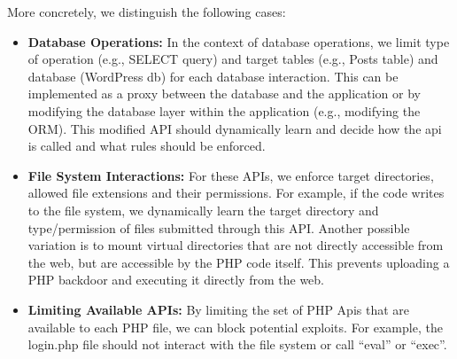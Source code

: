More concretely, we distinguish the following cases:
\begin{itemize}
  \item \textbf{Database Operations:} In the context of database operations, we limit type of operation (e.g., SELECT query) and target tables (e.g., Posts table) and database (WordPress db) for each database interaction. This can be implemented as a proxy between the database and the application or by modifying the database layer within the application (e.g., modifying the ORM). This modified API should dynamically learn and decide how the api is called and what rules should be enforced.
  \item \textbf{File System Interactions:} For these APIs, we enforce target directories, allowed file extensions and their permissions. For example, if the code writes to the file system, we dynamically learn the target directory and type/permission of files submitted through this API.
  Another possible variation is to mount virtual directories that are not directly accessible from the web, but are accessible by the PHP code itself. This prevents uploading a PHP backdoor and executing it directly from the web.
  \item \textbf{Limiting Available APIs:} By limiting the set of PHP Apis that are available to each PHP file, we can block potential exploits. For example, the login.php file should not interact with the file system or call “eval” or “exec”.
\end{itemize}
